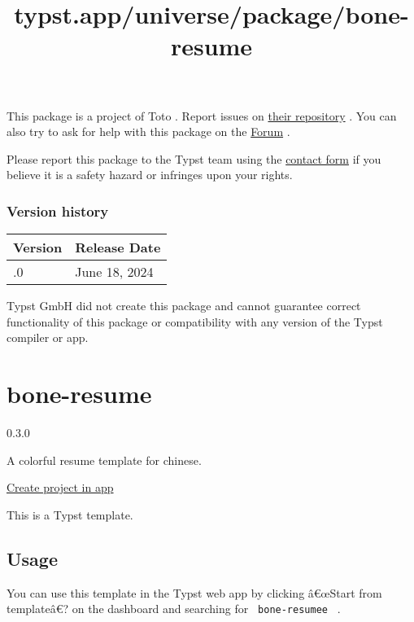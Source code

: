 This package is a project of Toto . Report issues on
\href{https://git.sr.ht/~toto/karnaugh}{their repository} . You can also
try to ask for help with this package on the
\href{https://forum.typst.app}{Forum} .

Please report this package to the Typst team using the
\href{https://typst.app/contact}{contact form} if you believe it is a
safety hazard or infringes upon your rights.

\label{versions}
\subsubsection{Version history}\label{version-history}

\begin{longtable}[]{@{}ll@{}}
\toprule\noalign{}
Version & Release Date \\
\midrule\noalign{}
\endhead
\bottomrule\noalign{}
\endlastfoot
0.1.0 & June 18, 2024 \\
\end{longtable}

Typst GmbH did not create this package and cannot guarantee correct
functionality of this package or compatibility with any version of the
Typst compiler or app.


\title{typst.app/universe/package/bone-resume}

\label{banner}
\label{template-thumbnail}

\section{bone-resume}\label{bone-resume}

{ 0.3.0 }

A colorful resume template for chinese.

\href{/app?template=bone-resume&version=0.3.0}{Create project in app}

\label{readme}
This is a Typst template.

\subsection{Usage}\label{usage}

You can use this template in the Typst web app by clicking â€œStart from
templateâ€? on the dashboard and searching for \texttt{\ bone-resumee\ }
.

